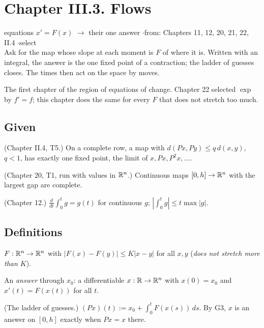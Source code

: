 \section*{Chapter III.3. Flows}
\begin{center}
{\normalsize equations $x' = F(x)$ $\to$ their one answer \quad$\cdot$\quad from: Chapters 11, 12, 20, 21, 22, II.4 \quad$\cdot$\quad select}\\[4pt]
{\small Ask for the map whose slope at each moment is $F$ of where it is. Written with an integral, the answer is the one fixed point of a contraction; the ladder of guesses closes. The times then act on the space by moves.}
\end{center}

The first chapter of the region of equations of change. Chapter 22 selected $\exp$ by $f' = f$; this chapter does the same for every $F$ that does not stretch too much.

\subsection*{Given}

\begin{lines}
\item[\lab{G1}] (Chapter II.4, T5.) On a complete row, a map with $d(Px, Py) \le q\,d(x, y)$, $q < 1$, has exactly one fixed point, the limit of $x, Px, P^2x, \dots$.
\item[\lab{G2}] (Chapter 20, T1, run with values in $\mathbb{R}^n$.) Continuous maps $[0, h] \to \mathbb{R}^n$ with the largest gap are complete.
\item[\lab{G3}] (Chapter 12.) $\frac{d}{dt}\int_0^t g = g(t)$ for continuous $g$; $|\int_0^t g| \le t \max |g|$.
\end{lines}

\subsection*{Definitions}

\begin{lines}
\item[\lab{D1}] $F : \mathbb{R}^n \to \mathbb{R}^n$ with $|F(x) - F(y)| \le K|x - y|$ for all $x, y$ (\emph{does not stretch more than $K$}).
\item[\lab{D2}] An \emph{answer} through $x_0$: a differentiable $x : \mathbb{R} \to \mathbb{R}^n$ with $x(0) = x_0$ and $x'(t) = F(x(t))$ for all $t$.
\item[\lab{D3}] (The ladder of guesses.) $(Px)(t) := x_0 + \int_0^t F(x(s))\,ds$. By G3, $x$ is an answer on $[0, h]$ exactly when $Px = x$ there.
\end{lines}

